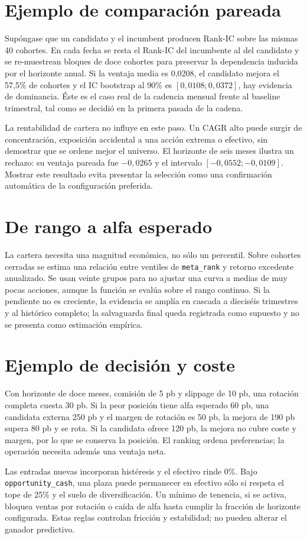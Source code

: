 \section{Ejemplo de comparación pareada}

Supóngase que un candidato y el incumbent producen Rank-IC sobre las mismas 40 cohortes. En cada
fecha se resta el Rank-IC del incumbente al del candidato y se re-muestrean bloques de doce cohortes
para preservar la dependencia inducida por el horizonte anual. Si la ventaja media es 0,0208, el
candidato mejora el 57,5\% de cohortes y el IC bootstrap al 90\% es $[0,0108;0,0372]$, hay evidencia
de dominancia. Éste es el caso real de la cadencia mensual frente al baseline trimestral, tal como
se decidió en la primera pasada de la cadena.

La rentabilidad de cartera no influye en este paso. Un CAGR alto puede surgir de concentración,
exposición accidental a una acción extrema o efectivo, sin demostrar que se ordene mejor el
universo. El horizonte de seis meses ilustra un rechazo: su ventaja pareada fue $-0,0265$ y el
intervalo $[-0,0552;-0,0109]$. Mostrar este resultado evita presentar la selección como una
confirmación automática de la configuración preferida.

\section{De rango a alfa esperado}

La cartera necesita una magnitud económica, no sólo un percentil. Sobre cohortes cerradas se estima
una relación entre ventiles de \texttt{meta\_rank} y retorno excedente anualizado. Se usan veinte
grupos para no ajustar una curva a medias de muy pocas acciones, aunque la función se evalúa sobre
el rango continuo. Si la pendiente no es creciente, la evidencia se amplía en cascada a dieciséis
trimestres y al histórico completo; la salvaguarda final queda registrada como supuesto y no se
presenta como estimación empírica.

\section{Ejemplo de decisión y coste}

Con horizonte de doce meses, comisión de 5 pb y slippage de 10 pb, una rotación completa cuesta 30
pb. Si la peor posición tiene alfa esperado 60 pb, una candidata externa 250 pb y el margen de
rotación es 50 pb, la mejora de 190 pb supera 80 pb y se rota. Si la candidata ofrece 120 pb, la
mejora no cubre coste y margen, por lo que se conserva la posición. El ranking ordena preferencias;
la operación necesita además una ventaja neta.

Las entradas nuevas incorporan histéresis y el efectivo rinde 0\%. Bajo
\texttt{opportunity\_cash}, una plaza puede permanecer en efectivo sólo si respeta el tope de 25\%
y el suelo de diversificación. Un mínimo de tenencia, si se activa, bloquea ventas por rotación o
caída de alfa hasta cumplir la fracción de horizonte configurada. Estas reglas controlan fricción y
estabilidad; no pueden alterar el ganador predictivo.
